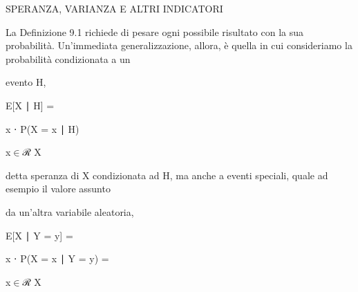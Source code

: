 \documentclass[a4paper,portrait,12pt]{article}
\begin{document}





\begin{flushleft}
SPERANZA, VARIANZA E ALTRI INDICATORI
\end{flushleft}





\begin{flushleft}
La Definizione 9.1 richiede di pesare ogni possibile risultato con la sua probabilit\`{a}. Un'immediata generalizzazione, allora, \`{e} quella in cui consideriamo la probabilit\`{a} condizionata a un
\end{flushleft}


\begin{flushleft}
evento H,
\end{flushleft}


\begin{flushleft}
E[X ∣ H] =
\end{flushleft}





\begin{flushleft}
x ⋅ P(X = x ∣ H)
\end{flushleft}


\begin{flushleft}
x$\in$ℛ X
\end{flushleft}





\begin{flushleft}
detta speranza di X condizionata ad H, ma anche a eventi speciali, quale ad esempio il valore assunto
\end{flushleft}


\begin{flushleft}
da un'altra variabile aleatoria,
\end{flushleft}


\begin{flushleft}
E[X ∣ Y = y] =
\end{flushleft}





\begin{flushleft}
x ⋅ P(X = x ∣ Y = y) =
\end{flushleft}


\begin{flushleft}
x$\in$ℛ X
\end{flushleft}
\end{document}
